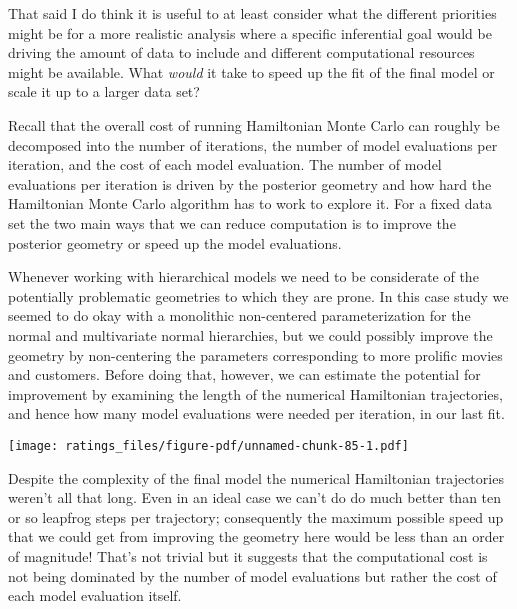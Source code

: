 \documentclass[
  letterpaper,
  DIV=11,
  numbers=noendperiod]{scrartcl}
\newenvironment{Shaded}{\begin{snugshade}}{\end{snugshade}}
\newcommand{\FunctionTok}[1]{\textcolor[rgb]{0.28,0.35,0.67}{#1}}
\newcommand{\NormalTok}[1]{\textcolor[rgb]{0.00,0.23,0.31}{#1}}
\newcommand{\SpecialCharTok}[1]{\textcolor[rgb]{0.37,0.37,0.37}{#1}}
\begin{document}
That said I do think it is useful to at least consider what the
different priorities might be for a more realistic analysis where a
specific inferential goal would be driving the amount of data to include
and different computational resources might be available. What
\emph{would} it take to speed up the fit of the final model or scale it
up to a larger data set?

Recall that the overall cost of running Hamiltonian Monte Carlo can
roughly be decomposed into the number of iterations, the number of model
evaluations per iteration, and the cost of each model evaluation. The
number of model evaluations per iteration is driven by the posterior
geometry and how hard the Hamiltonian Monte Carlo algorithm has to work
to explore it. For a fixed data set the two main ways that we can reduce
computation is to improve the posterior geometry or speed up the model
evaluations.

Whenever working with hierarchical models we need to be considerate of
the potentially problematic geometries to which they are prone. In this
case study we seemed to do okay with a monolithic non-centered
parameterization for the normal and multivariate normal hierarchies, but
we could possibly improve the geometry by non-centering the parameters
corresponding to more prolific movies and customers. Before doing that,
however, we can estimate the potential for improvement by examining the
length of the numerical Hamiltonian trajectories, and hence how many
model evaluations were needed per iteration, in our last fit.

\begin{Shaded}
\end{Shaded}

\texttt{[image: ratings\_files/figure-pdf/unnamed-chunk-85-1.pdf]}

Despite the complexity of the final model the numerical Hamiltonian
trajectories weren't all that long. Even in an ideal case we can't do do
much better than ten or so leapfrog steps per trajectory; consequently
the maximum possible speed up that we could get from improving the
geometry here would be less than an order of magnitude! That's not
trivial but it suggests that the computational cost is not being
dominated by the number of model evaluations but rather the cost of each
model evaluation itself.
\end{document}
